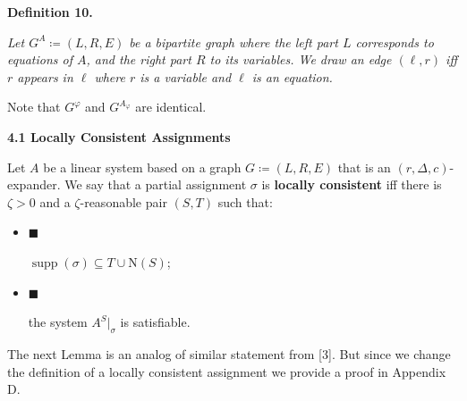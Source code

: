 \documentclass[10pt,a4paper]{article}
\begin{document}


\par\medskip\noindent\textbf{
\textbf{Definition 10}\textbf{.}
}\par



\emph{Let $G^{A}\coloneqq(L,R,E)$ be a bipartite graph where the left part $L$ corresponds to equations
of $A$, and the right part $R$ to its variables. We draw an edge $(\ell,r)$ iff $r$ appears in
$\ell$ where $r$ is a variable and $\ell$ is an equation.}\par






Note that $G^{\varphi}$ and $G^{A_{\varphi}}$ are identical.\par




\par\medskip\noindent\textbf{
4.1 Locally Consistent Assignments}\par




Let $A$ be a linear system based on a graph $G\coloneqq(L,R,E)$ that is an $(r,\Delta,c)$-expander. We say that a partial assignment $\sigma$ is \textbf{locally consistent} iff there is
$\zeta>0$ and a $\zeta$-reasonable pair $(S,T)$ such that:\par


\begin{itemize}


\item[] 
$\blacksquare$ 


$\operatorname*{supp}(\sigma)\subseteq T\cup\mathrm{N}\left(S\right)$;\par





\item[] 
$\blacksquare$ 


the system $A^{S}|_{\sigma}$ is satisfiable.\par





\end{itemize}




The next Lemma is an analog of similar statement from [3]. But since we change the
definition of a locally consistent assignment we provide a proof in Appendix
D.\par
\end{document}
